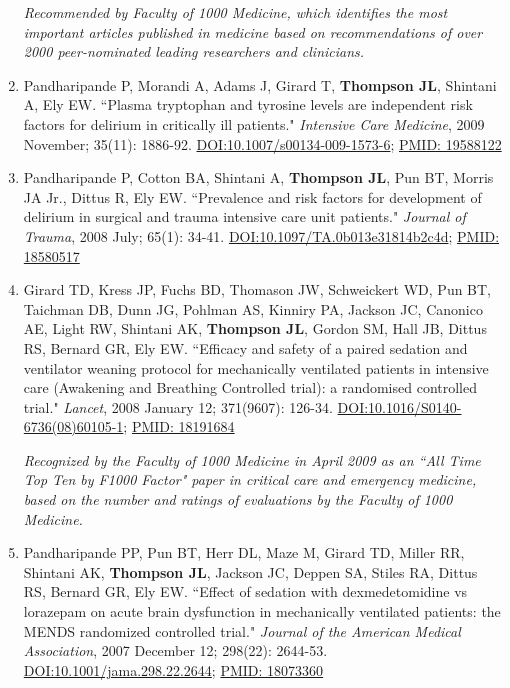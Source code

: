 \documentclass[5pt]{article}
\begin{document}
\begin{enumerate}
    \emph{Recommended by Faculty of 1000 Medicine, which identifies the most important articles published in medicine based on recommendations of over 2000 peer-nominated leading researchers and clinicians.}
\item Pandharipande P, Morandi A, Adams J, Girard T, \textbf{Thompson JL}, Shintani A, Ely EW. ``Plasma tryptophan and tyrosine levels are independent risk factors for delirium in critically ill patients." \emph{Intensive Care Medicine}, 2009 November; 35(11): 1886-92. \href{https://doi.org/10.1007/s00134-009-1573-6}{DOI:10.1007/s00134-009-1573-6}; \href{https://www.ncbi.nlm.nih.gov/pubmed/19588122}{PMID: 19588122}
\item Pandharipande P, Cotton BA, Shintani A, \textbf{Thompson JL}, Pun BT, Morris JA Jr., Dittus R, Ely EW. ``Prevalence and risk factors for development of delirium in surgical and trauma intensive care unit patients." \emph{Journal of Trauma}, 2008 July; 65(1): 34-41. \href{https://doi.org/10.1097/TA.0b013e31814b2c4d}{DOI:10.1097/TA.0b013e31814b2c4d}; \href{https://www.ncbi.nlm.nih.gov/pubmed/18580517}{PMID: 18580517}
\item Girard TD, Kress JP, Fuchs BD, Thomason JW, Schweickert WD, Pun BT, Taichman DB, Dunn JG, Pohlman AS, Kinniry PA, Jackson JC, Canonico AE, Light RW, Shintani AK, \textbf{Thompson JL}, Gordon SM, Hall JB, Dittus RS, Bernard GR, Ely EW. ``Efficacy and safety of a paired sedation and ventilator weaning protocol for mechanically ventilated patients in intensive care (Awakening and Breathing Controlled trial): a randomised controlled trial." \emph{Lancet}, 2008 January 12; 371(9607): 126-34. \href{https://doi.org/10.1016/S0140-6736(08)60105-1}{DOI:10.1016/S0140-6736(08)60105-1}; \href{https://www.ncbi.nlm.nih.gov/pubmed/18191684}{PMID: 18191684}

    \emph{Recognized by the Faculty of 1000 Medicine in April 2009 as an ``All Time Top Ten by F1000 Factor" paper in critical care and emergency medicine, based on the number and ratings of evaluations by the Faculty of 1000 Medicine.}
\item Pandharipande PP, Pun BT, Herr DL, Maze M, Girard TD, Miller RR, Shintani AK, \textbf{Thompson JL}, Jackson JC, Deppen SA, Stiles RA, Dittus RS, Bernard GR, Ely EW. ``Effect of sedation with dexmedetomidine vs lorazepam on acute brain dysfunction in mechanically ventilated patients: the MENDS randomized controlled trial." \emph{Journal of the American Medical Association}, 2007 December 12; 298(22): 2644-53. \href{https://doi.org/10.1001/jama.298.22.2644}{DOI:10.1001/jama.298.22.2644}; \href{https://www.ncbi.nlm.nih.gov/pubmed/18073360}{PMID: 18073360}


\end{enumerate}
\end{document}
